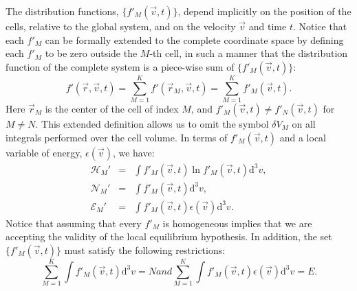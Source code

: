 The distribution functions, $\{f'_M(\vec{v},t)\}$, depend implicitly on the position of the cells,
relative to the global system, and on the velocity
$\vec{v}$ and time $t$. Notice that each $f'_M$ can be formally extended to the complete coordinate space
by defining each $f'_M$ to be zero outside the $M$-th cell, in such a manner that
the distribution function of the complete system is a piece-wise sum
of $\{f'_M(\vec v,t)\}$:
%
\begin{equation}
   f'(\vec r,\vec v,t)=\sum_{M=1}^Kf'(\vec r_M,\vec v,t)=\sum_{M=1}^Kf'_M(\vec v,t).
\end{equation}
%
Here $\vec r_M$ is the center of the cell of index $M$, and $f'_M(\vec v,t)\neq f'_N(\vec v,t)$
for $M\neq N$. This extended definition
allows us to omit the symbol $\delta V_M$ on all integrals performed over the cell volume.
In terms of $f'_M(\vec{v},t)$ and a local variable of energy, $\epsilon(\vec{v})$, we have:
%
\begin{subequations}\label{eq:cellrestrictions}
\begin{eqnarray}
    \mathcal{H}_M' & = &  \int f'_M(\vec{v},t) \ln f'_{M}(\vec{v},t)
      \mathrm{d}^{3}v \label{eq:Hcell},\\
    \mathcal{N}_M' & = & \int f'_{M}(\vec{v} ,t) \mathrm{d}^{3}v,\label{eq:Ncell}\\
    \mathcal{E}_M' & = & \int f'_{M}(\vec{v},t)\epsilon(\vec{v}) \mathrm{d}^{3}v\label{eq:Ecell}.
\end{eqnarray}
\end{subequations}
%
Notice that assuming that every $f'_M$ is homogeneous implies that we are accepting the validity of the
local equilibrium hypothesis. In addition, the set $\{f'_{M}(\vec{v},t)\}$ must satisfy the following restrictions:
%
\begin{subequations}\label{eq:micro}
\begin{equation}\label{eq:micron}
    \sum_{M=1}^{K}\int f'_M(\vec{v},t)\mathrm{d}^3v =N
\end{equation}
and
\begin{equation}\label{eq:microe}
    \sum_{M=1}^{K}\int f'_M(\vec{v},t)\epsilon(\vec{v})\mathrm{d}^3v=E.
\end{equation}
\end{subequations}
%

